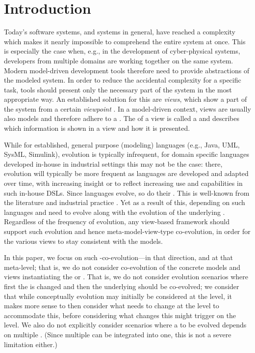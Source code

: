 \section{Introduction}
\label{sec:Introduction}

Today's software systems, and systems in general, have reached a complexity which makes it nearly impossible to comprehend the entire system at once.
This is especially the case when, e.g., in the development of cyber-physical systems, developers from multiple domains are working together on the same system.
Modern model-driven development tools therefore need to provide abstractions of the modeled system.
In order to reduce the accidental complexity for a specific task, tools should present only the necessary part of the system in the most appropriate way.
An established solution for this are \emph{views}, which show a part of the system from a certain \emph{viewpoint} \autocite{atkinson_orthographic_2010}.
In a model-driven context, views are usually also models and therefore adhere to a \metamodel.
The \metamodel of a view is called a \viewtype \autocite{goldschmidt_towards_2012} and describes which information is shown in a view and how it is presented.

While for established, general purpose (modeling) languages (e.g., Java, UML, SysML, Simulink), evolution is typically infrequent, for domain specific languages developed in-house in industrial settings this may not be the case: there, evolution will typically be more frequent as languages are developed and adapted over time, with increasing insight or to reflect increasing use and capabilities in such in-house DSLs. Since languages evolve, so do their \metamodels. This is well-known from the literature and industrial practice \cite{durisic_evolution_2014}. Yet as a result of this, \viewtypes depending on such languages and \metamodels need to evolve along with the evolution of the underlying \metamodels. Regardless of the frequency of \metamodel evolution, any view-based framework should support such evolution and hence meta-model-view-type co-evolution, in order for the various views to stay consistent with the models. 

In this paper, we focus on such \metamodel-\viewtype co-evolution---in that direction, and at that meta-level; that is, we do not consider co-evolution of the concrete models and views instantiating the \metamodel or \viewtype. That is, we do not consider evolution scenarios where first the \viewtype is changed and then the underlying \metamodel should be co-evolved; we consider that while conceptually evolution may initially be considered at the \viewtype level, it makes more sense to then consider what needs to change at the \metamodel level to accommodate this, before considering what changes this might trigger on the \viewtype level. We also do not explicitly consider scenarios where a \viewtype to be evolved depends on multiple \metamodels. (Since multiple \metamodels can be integrated into one, this is not a severe limitation either.)

